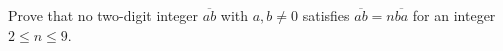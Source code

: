 Prove that no two-digit integer $\overline{ab}$ with $a,b\ne0$ satisfies $\overline{ab}=n\overline{ba}$ for an integer $2\le n\le9$.
